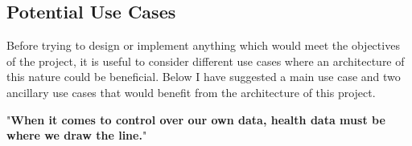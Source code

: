 \subsection{Potential Use Cases}

Before trying to design or implement anything which would meet the objectives of the project, it is useful to consider different use cases where an architecture of this nature could be beneficial. Below I have suggested a main use case and two ancillary use cases that would benefit from the architecture of this project.

\begin{displayquote}{
  "\textbf{When it comes to control over our own data, health data must be where we draw the line.}"~\cite{wilbankstopol:2016:article}
}\end{displayquote}






